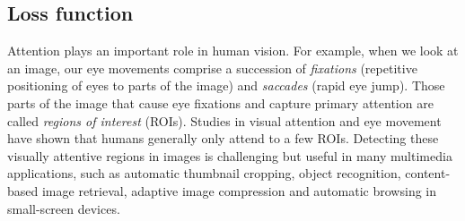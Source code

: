 \subsection{Loss function}

Attention plays an important role in human vision. For example, when
we look at an image, our eye movements comprise a succession of {\em
fixations} (repetitive positioning of eyes to parts of the image)
and {\em saccades} (rapid eye jump). Those parts of the image that
cause eye fixations and capture primary attention are called {\em
regions of interest} (ROIs). Studies in visual attention and eye
movement have shown that humans generally only attend to a few ROIs.
Detecting these visually attentive regions in images is challenging
but useful in many multimedia applications, such as automatic
thumbnail cropping, object recognition, content-based image
retrieval, adaptive image compression and automatic browsing in
small-screen devices.


